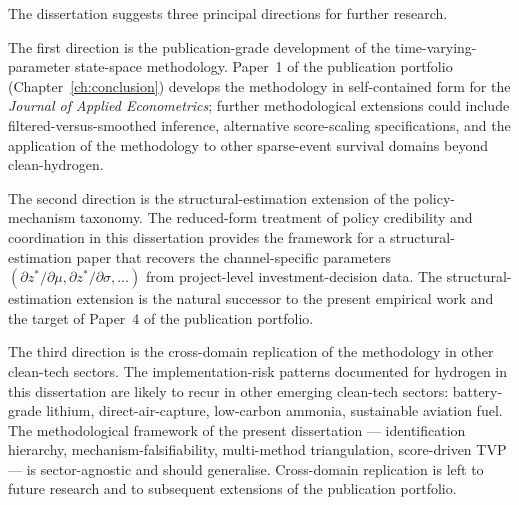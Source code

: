 The dissertation suggests three principal directions for further research.

The first direction is the publication-grade development of the time-varying-parameter state-space methodology. Paper~1 of the publication portfolio (Chapter~\ref{ch:conclusion}) develops the methodology in self-contained form for the \emph{Journal of Applied Econometrics}; further methodological extensions could include filtered-versus-smoothed inference, alternative score-scaling specifications, and the application of the methodology to other sparse-event survival domains beyond clean-hydrogen.

The second direction is the structural-estimation extension of the policy-mechanism taxonomy. The reduced-form treatment of policy credibility and coordination in this dissertation provides the framework for a structural-estimation paper that recovers the channel-specific parameters $(\partial z^*/\partial \mu, \partial z^*/\partial \sigma, \ldots)$ from project-level investment-decision data. The structural-estimation extension is the natural successor to the present empirical work and the target of Paper~4 of the publication portfolio.

The third direction is the cross-domain replication of the methodology in other clean-tech sectors. The implementation-risk patterns documented for hydrogen in this dissertation are likely to recur in other emerging clean-tech sectors: battery-grade lithium, direct-air-capture, low-carbon ammonia, sustainable aviation fuel. The methodological framework of the present dissertation --- identification hierarchy, mechanism-falsifiability, multi-method triangulation, score-driven TVP --- is sector-agnostic and should generalise. Cross-domain replication is left to future research and to subsequent extensions of the publication portfolio.
